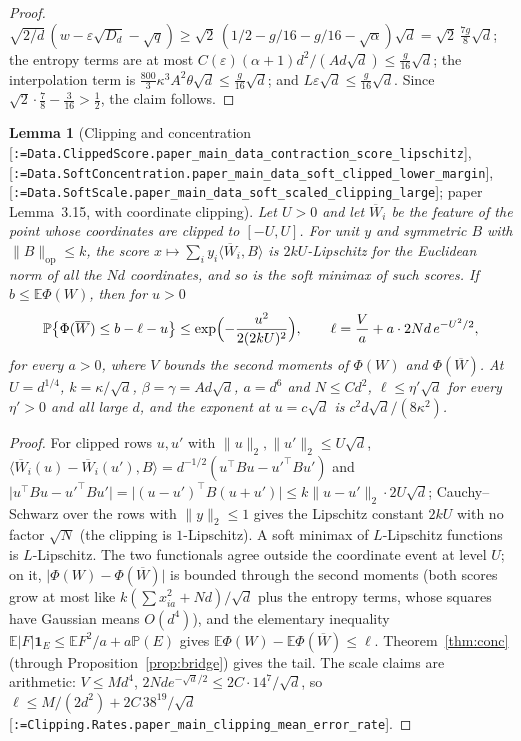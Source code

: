 \documentclass[11pt]{article}
\makeatletter
\newcommand{\formal@break}[1]{\@tfor\formal@tok:=#1\do{%
  \formal@tok
  \expandafter\ifx\formal@tok.\allowbreak\else
  \expandafter\ifx\formal@tok\_\allowbreak\fi\fi}}
\DeclareRobustCommand{\formal}[1]{\textnormal{[\texttt{\small\formal@break{#1}}]}}
\newcommand{\E}{\mathbb{E}}
\newcommand{\Prob}{\mathbb{P}}
\newcommand{\ip}[2]{\langle #1, #2\rangle}
\newcommand{\norm}[1]{\lVert #1\rVert}
\newcommand{\abs}[1]{\lvert #1\rvert}
\newcommand{\op}{\mathrm{op}}
\newcommand{\sqd}{\sqrt{d}}
\newcommand{\Dd}{D}
\newcommand{\one}{\mathbf{1}}
\theoremstyle{plain}
\newtheorem{lemma}[theorem]{Lemma}
\theoremstyle{definition}
\makeatother
\begin{document}
\begin{proof}
$\sqrt{2/d}\,(w - \varepsilon\sqrt{\Dd_d} - \sqrt q) \ge \sqrt2\,(1/2 - g/16 - g/16 - \sqrt\alpha)\sqd = \sqrt2\,\frac{7g}{8}\sqd$;
the entropy terms are at most $C(\varepsilon)(\alpha + 1)d^2/(Ad\sqd) \le \frac{g}{16}\sqd$;
the interpolation term is $\frac{800}{3}\kappa^3A^2\theta\sqd \le \frac g{16}\sqd$;
and $L\varepsilon\sqd \le \frac g{16}\sqd$. Since $\sqrt2\cdot\frac78 - \frac3{16} > \frac12$,
the claim follows.
\end{proof}

\begin{lemma}[Clipping and concentration \formal{Data.ClippedScore.paper\_main\_data\_contraction\_score\_lipschitz}, \formal{Data.SoftConcentration.paper\_main\_data\_soft\_clipped\_lower\_margin}, \formal{Data.SoftScale.paper\_main\_data\_soft\_scaled\_clipping\_large}; paper Lemma~3.15, with coordinate clipping]\label{lem:clip}
Let $U > 0$ and let $\overline W_i$ be the feature of the point whose
coordinates are clipped to $[-U, U]$. For unit $y$ and symmetric $B$ with
$\norm{B}_\op \le k$, the score $x \mapsto \sum_iy_i\ip{\overline W_i}{B}$ is
$2kU$-Lipschitz for the Euclidean norm of all the $Nd$ coordinates, and so
is the soft minimax of such scores. If $b \le \E\Phi(W)$, then for $u > 0$
\[
\Prob\bigl\{\Phi(\overline W) \le b - \ell - u\bigr\} \le \exp\Bigl(-\frac{u^2}{2(2kU)^2}\Bigr),
\qquad \ell = \frac{V}{a} + a\cdot2Nd\,e^{-U^2/2},
\]
for every $a > 0$, where $V$ bounds the second moments of $\Phi(W)$ and
$\Phi(\overline W)$. At $U = d^{1/4}$, $k = \kappa/\sqd$, $\beta = \gamma = Ad\sqd$,
$a = d^6$ and $N \le Cd^2$, $\ell \le \eta'\sqd$ for every $\eta' > 0$ and
all large $d$, and the exponent at $u = c\sqd$ is $c^2d\sqd/(8\kappa^2)$.
\end{lemma}

\begin{proof}
For clipped rows $u, u'$ with $\norm{u}_2, \norm{u'}_2 \le U\sqd$,
$\ip{\overline W_i(u) - \overline W_i(u')}{B} = d^{-1/2}(u^{\top}Bu - u'^{\top}Bu')$
and $\abs{u^{\top}Bu - u'^{\top}Bu'} = \abs{(u - u')^{\top}B(u + u')} \le k\norm{u - u'}_2\cdot2U\sqd$;
Cauchy--Schwarz over the rows with $\norm{y}_2 \le 1$ gives the Lipschitz
constant $2kU$ with no factor $\sqrt N$ (the clipping is $1$-Lipschitz).
A soft minimax of $L$-Lipschitz functions is $L$-Lipschitz. The two
functionals agree outside the coordinate event at level $U$; on it,
$\abs{\Phi(W) - \Phi(\overline W)}$ is bounded through the second moments
(both scores grow at most like $k(\sum x_{ia}^2 + Nd)/\sqd$ plus the entropy
terms, whose squares have Gaussian means $O(d^4)$), and the elementary
inequality $\E\abs{F}\one_E \le \E F^2/a + a\Prob(E)$ gives
$\E\Phi(W) - \E\Phi(\overline W) \le \ell$. Theorem~\ref{thm:conc}
(through Proposition~\ref{prop:bridge}) gives the tail. The scale claims
are arithmetic: $V \le Md^4$, $2Nde^{-\sqd/2} \le 2C\cdot14^7/\sqd$, so
$\ell \le M/(2d^2) + 2C\,38^{19}/\sqd$ \formal{Clipping.Rates.paper\_main\_clipping\_mean\_error\_rate}.
\end{proof}
\end{document}
